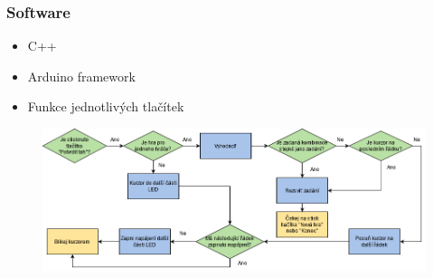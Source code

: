 \documentclass[%
  12pt,       				%
	t,                  %
	aspectratio=1610,   %
	unicode,						%
]{beamer}				    	%
\begin{document}

\begin{frame} 
	\frametitle{Software}
			\vspace{0.5cm}
			\begin{itemize}
				\item C++ 
				\item Arduino framework
				\item Funkce jednotlivých tlačítek
			\end{itemize}
			\begin{figure}%
				\centering
				\vspace{0.3cm}	              %
				\includegraphics[width=0.7\columnwidth]{obrazky/Enter.png}
			\end{figure}%
	
\end{frame}
\end{document}
